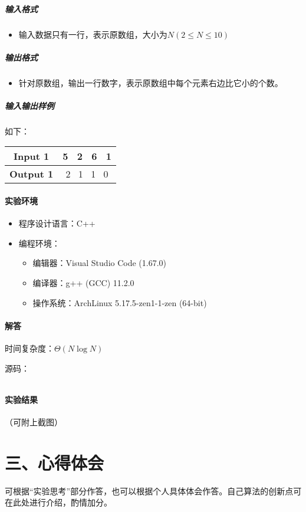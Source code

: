 \documentclass[12pt,a4paper]{ctexart}
\begin{document}
\subparagraph{输入格式}
    \begin{itemize}
        \item 输入数据只有一行，表示原数组，大小为$N(2 \leq N \leq 10)$
    \end{itemize}

\subparagraph{输出格式}
    \begin{itemize}
        \item 针对原数组，输出一行数字，表示原数组中每个元素右边比它小的个数。
    \end{itemize}
    

\subparagraph{输入输出样例}
如下：
\begin{table}[htb]   
    \begin{center}   
    \begin{tabular}{|c|c|}   
    \hline   \textbf{Input 1} &5 \ 2 \ 6 \ 1\\   
    \hline   \textbf{Output 1} &2 \ 1 \ 1 \ 0 \\ 
    \hline   
    \end{tabular}   
    \end{center}   
\end{table}

\vspace{5pt}

\paragraph{实验环境}
\begin{itemize}
    \item 程序设计语言：C++
    \item 编程环境：
    \begin{itemize}
        \item 编辑器：Visual Studio Code (1.67.0)
        \item 编译器：g++ (GCC) 11.2.0
        \item 操作系统：ArchLinux 5.17.5-zen1-1-zen (64-bit)
    \end{itemize}
\end{itemize}

\vspace{5pt}

\paragraph{解答} 时间复杂度：$\Theta(N \log N)$

源码：
\inputminted[bgcolor=codebg,frame=lines,autogobble,linenos=true,breaklines]{cpp}{src/t3.cpp}

\vspace{5pt}

\paragraph{实验结果}
（可附上截图）


\vspace{5pt}





\section*{三、心得体会}
    可根据“实验思考”部分作答，也可以根据个人具体体会作答。自己算法的创新点可在此处进行介绍，酌情加分。
\end{document}
